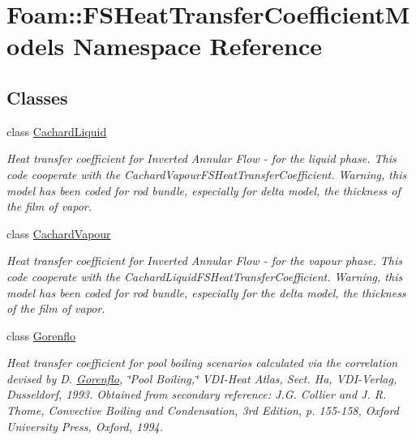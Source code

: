 \hypertarget{namespaceFoam_1_1FSHeatTransferCoefficientModels}{}\section{Foam\+:\+:F\+S\+Heat\+Transfer\+Coefficient\+Models Namespace Reference}
\label{namespaceFoam_1_1FSHeatTransferCoefficientModels}
\subsection*{Classes}
\begin{DoxyCompactItemize}
\item 
class \hyperlink{classFoam_1_1FSHeatTransferCoefficientModels_1_1CachardLiquid}{Cachard\+Liquid}
\begin{DoxyCompactList}\small\item\em Heat transfer coefficient for Inverted Annular Flow -\/ for the liquid phase. This code cooperate with the Cachard\+Vapour\+F\+S\+Heat\+Transfer\+Coefficient. Warning, this model has been coded for rod bundle, especially for delta model, the thickness of the film of vapor. \end{DoxyCompactList}\item 
class \hyperlink{classFoam_1_1FSHeatTransferCoefficientModels_1_1CachardVapour}{Cachard\+Vapour}
\begin{DoxyCompactList}\small\item\em Heat transfer coefficient for Inverted Annular Flow -\/ for the vapour phase. This code cooperate with the Cachard\+Liquid\+F\+S\+Heat\+Transfer\+Coefficient. Warning, this model has been coded for rod bundle, especially for the delta model, the thickness of the film of vapor. \end{DoxyCompactList}\item 
class \hyperlink{classFoam_1_1FSHeatTransferCoefficientModels_1_1Gorenflo}{Gorenflo}
\begin{DoxyCompactList}\small\item\em Heat transfer coefficient for pool boiling scenarios calculated via the correlation devised by D. \hyperlink{classFoam_1_1FSHeatTransferCoefficientModels_1_1Gorenflo}{Gorenflo}, \char`\"{}\+Pool Boiling,\char`\"{} V\+D\+I-\/\+Heat Atlas, Sect. Ha, V\+D\+I-\/\+Verlag, Dusseldorf, 1993. Obtained from secondary reference\+: J.\+G. Collier and J. R. Thome, Convective Boiling and Condensation, 3rd Edition, p. 155-\/158, Oxford University Press, Oxford, 1994. \end{DoxyCompactList}\item 

\end{DoxyCompactItemize}
